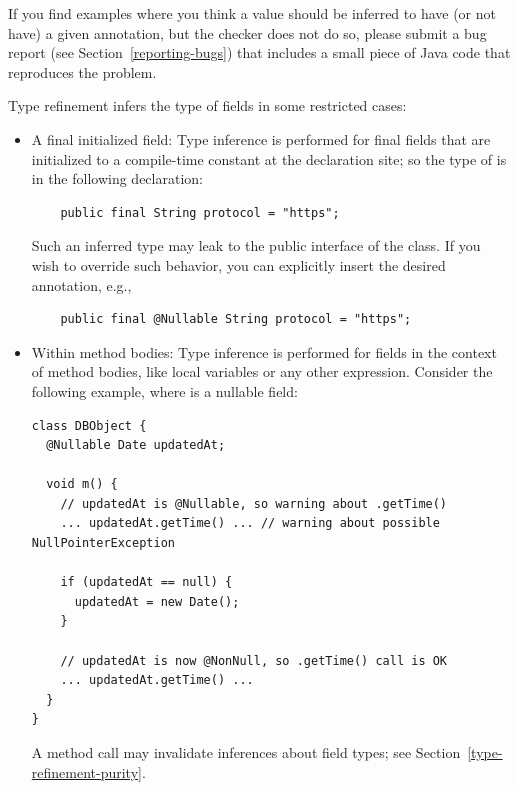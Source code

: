 If you find examples where you think a value should be inferred to have
(or not have) a
given annotation, but the checker does not do so, please submit a bug
report (see Section~\ref{reporting-bugs}) that includes a small piece of
Java code that reproduces the problem.



Type refinement infers the type of fields in some restricted cases:

\begin{itemize}

\item
A final initialized field:
Type inference is performed for final fields that are initialized to a
compile-time constant at the declaration site; so the type of 
is  in the following declaration:

\begin{Verbatim}
    public final String protocol = "https";
\end{Verbatim}

Such an inferred type may leak to the public interface of the class.
If you wish to override such behavior, you can explicitly insert the desired
annotation, e.g.,

\begin{Verbatim}
    public final @Nullable String protocol = "https";
\end{Verbatim}

\item
Within method bodies:
Type inference is performed for fields in the context of method bodies,
like local variables or any other expression.
Consider the following example, where  is a nullable
field:

\begin{Verbatim}
class DBObject {
  @Nullable Date updatedAt;

  void m() {
    // updatedAt is @Nullable, so warning about .getTime()
    ... updatedAt.getTime() ... // warning about possible NullPointerException

    if (updatedAt == null) {
      updatedAt = new Date();
    }

    // updatedAt is now @NonNull, so .getTime() call is OK
    ... updatedAt.getTime() ...
  }
}
\end{Verbatim}

A method call may invalidate inferences about field types; see
Section~\ref{type-refinement-purity}.

\end{itemize}


